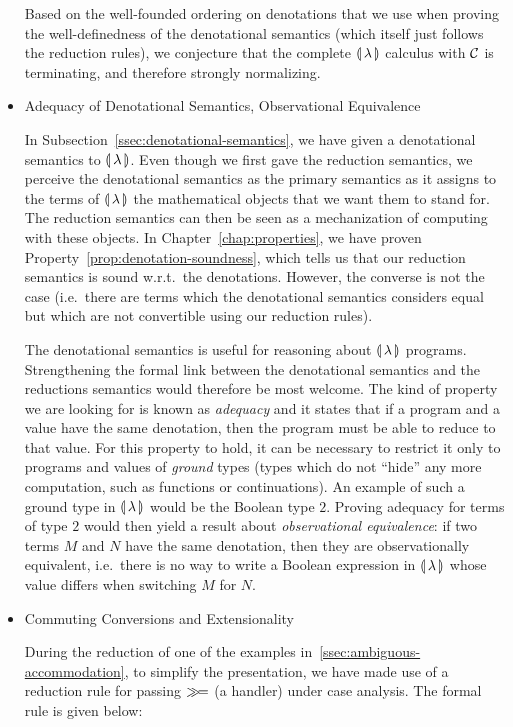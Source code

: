 \begin{itemize}
  Based on the well-founded ordering on denotations that we use when
  proving the well-definedness of the denotational semantics (which itself
  just follows the reduction rules), we conjecture that the complete
  ${\llparenthesis \, \lambda \, \rrparenthesis}$ calculus with $\mathcal{C}$ is terminating, and therefore strongly
  normalizing.
  

\item Adequacy of Denotational Semantics, Observational Equivalence

  In Subsection~\ref{ssec:denotational-semantics}, we have given a
  denotational semantics to ${\llparenthesis \, \lambda \, \rrparenthesis}$. Even though we first gave the
  reduction semantics, we perceive the denotational semantics as the
  primary semantics as it assigns to the terms of ${\llparenthesis \, \lambda \, \rrparenthesis}$ the mathematical
  objects that we want them to stand for. The reduction semantics can then
  be seen as a mechanization of computing with these objects. In
  Chapter~\ref{chap:properties}, we have proven
  Property~\ref{prop:denotation-soundness}, which tells us that our
  reduction semantics is sound w.r.t.\ the denotations. However, the
  converse is not the case (i.e.\ there are terms which the denotational
  semantics considers equal but which are not convertible using our
  reduction rules).

  The denotational semantics is useful for reasoning about ${\llparenthesis \, \lambda \, \rrparenthesis}$
  programs. Strengthening the formal link between the denotational
  semantics and the reductions semantics would therefore be most
  welcome. The kind of property we are looking for is known as
  \emph{adequacy} and it states that if a program and a value have the same
  denotation, then the program must be able to reduce to that value. For
  this property to hold, it can be necessary to restrict it only to
  programs and values of \emph{ground} types (types which do not ``hide''
  any more computation, such as functions or continuations). An example of
  such a ground type in ${\llparenthesis \, \lambda \, \rrparenthesis}$ would be the Boolean type $2$. Proving
  adequacy for terms of type $2$ would then yield a result about
  \emph{observational equivalence}: if two terms $M$ and $N$ have the same
  denotation, then they are observationally equivalent, i.e.\ there is no
  way to write a Boolean expression in ${\llparenthesis \, \lambda \, \rrparenthesis}$ whose value differs when
  switching $M$ for $N$.


\item Commuting Conversions and Extensionality

  During the reduction of one of the examples
  in~\ref{ssec:ambiguous-accommodation}, to simplify the presentation, we
  have made use of a reduction rule for passing $\mathbin{\gg\!=}$ (a handler) under
  case analysis. The formal rule is given below:
  

\end{itemize}
